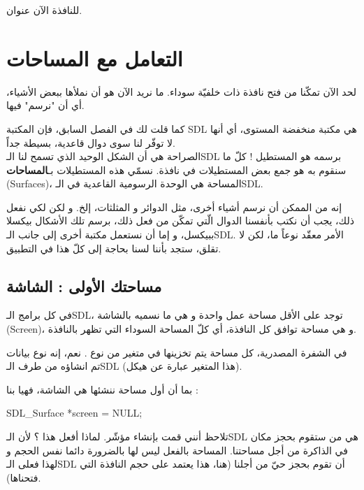 للنافذة الآن عنوان.


\section{التعامل مع المساحات}

لحد الآن تمكّنا من فتح نافذة ذات خلفيّة سوداء. ما نريد الآن هو أن نملأها ببعض الأشياء، أي أن "نرسم" فيها.

كما قلت لك في الفصل السابق، فإن المكتبة
\textenglish{SDL}
هي مكتبة منخفضة المستوى، أي أنها لا توفّر لنا سوى دوال قاعدية، بسيطة جداً.\\
الصراحة هي أن الشكل الوحيد الذي تسمح لنا الـ\textenglish{SDL}
برسمه هو المستطيل ! كلّ ما سنقوم به هو جمع بعض المستطيلات في نافذة. نسمّي هذه المستطيلات بـ\textbf{المساحات}
(\textenglish{Surfaces})،
المساحة هي الوحدة الرسومية القاعدية في الـ\textenglish{SDL}.

\begin{information}
إنه من الممكن أن نرسم أشياء أخرى، مثل الدوائر و المثلثات، إلخ. و لكن لكي نفعل ذلك، يجب أن نكتب بأنفسنا الدوال الّتي تمكّن من فعل ذلك، برسم تلك الأشكال بيكسلا ببيكسل، و إما أن نستعمل مكتبة أخرى إلى جانب الـ\textenglish{SDL}.
الأمر معقّد نوعاً ما، لكن لا تقلق، ستجد بأننا لسنا بحاجة إلى كلّ هذا في التطبيق.
\end{information}

\subsection{مساحتك الأولى : الشاشة}

في كل برامج الـ\textenglish{SDL}،
توجد على الأقل مساحة عمل واحدة و هي ما نسميه بالشاشة 
(\textenglish{Screen})،
و هي مساحة توافق كل النافذة، أي كلّ المساحة السوداء التي تظهر بالنافذة.

في الشفرة المصدرية، كل مساحة يتم تخزينها في متغير من نوع
.
نعم، إنه نوع بيانات تم انشاؤه من طرف الـ\textenglish{SDL}
(هذا المتغير عبارة عن هيكل).

بما أن أول مساحة ننشئها هي الشاشة، فهيا بنا :

\begin{Csource}
SDL_Surface *screen = NULL;
\end{Csource}

تلاحظ أنني قمت بإنشاء مؤشّر. لماذا أفعل هذا ؟ لأن الـ\textenglish{SDL}
هي من ستقوم بحجز مكان في الذاكرة من أجل مساحتنا. المساحة بالفعل ليس لها بالضرورة دائما نفس الحجم و لهذا فعلى الـ\textenglish{SDL}
أن تقوم بحجز حيّ من أجلنا (هنا، هذا يعتمد على حجم النافذة التي فتحناها).

